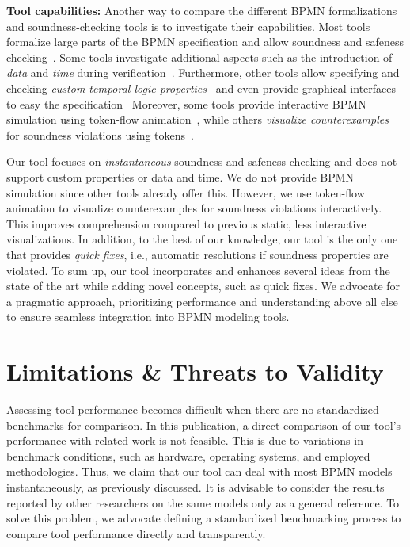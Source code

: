 \documentclass[runningheads]{llncs}
\begin{document}
\textbf{Tool capabilities:}
Another way to compare the different BPMN formalizations and soundness-checking tools is to investigate their capabilities.
Most tools formalize large parts of the BPMN specification and allow soundness and safeness checking~\cite{corradiniFormalApproachAnalysis2021,houhouFirstOrderLogicVerification2022,krauterFormalizationAnalysisBPMN2023,krauterHigherorderTransformationApproach2023}.
Some tools investigate additional aspects such as the introduction of \textit{data} and \textit{time} during verification~\cite{corradiniFormalisingAnimatingMultiple2022,houhouFirstOrderLogicVerification2022}.
Furthermore, other tools allow specifying and checking \textit{custom temporal logic properties}~\cite{corradiniFormalApproachAnalysis2021,krauterFormalizationAnalysisBPMN2023} and even provide graphical interfaces to easy the specification~\cite{krauterHigherorderTransformationApproach2023}
Moreover, some tools provide interactive BPMN simulation using token-flow animation~\cite{camundaservicesgmbhBpmnjsTokenSimulation2024,corradiniFormalisingAnimatingMultiple2022}, while others \textit{visualize counterexamples} for soundness violations using tokens~\cite{houhouFirstOrderLogicVerification2022}.

Our tool focuses on \textit{instantaneous} soundness and safeness checking and does not support custom properties or data and time.
We do not provide BPMN simulation since other tools already offer this.
However, we use token-flow animation to visualize counterexamples for soundness violations interactively.
This improves comprehension compared to previous static, less interactive visualizations.
In addition, to the best of our knowledge, our tool is the only one that provides \textit{quick fixes}, i.e., automatic resolutions if soundness properties are violated.
To sum up, our tool incorporates and enhances several ideas from the state of the art while adding novel concepts, such as quick fixes.
We advocate for a pragmatic approach, prioritizing performance and understanding above all else to ensure seamless integration into BPMN modeling tools.

\section{Limitations \& Threats to Validity} \label{sec:limitations}
Assessing tool performance becomes difficult when there are no standardized benchmarks for comparison.
In this publication, a direct comparison of our tool's performance with related work is not feasible.
This is due to variations in benchmark conditions, such as hardware, operating systems, and employed methodologies.
Thus, we claim that our tool can deal with most BPMN models instantaneously, as previously discussed.
It is advisable to consider the results reported by other researchers on the same models only as a general reference.
To solve this problem, we advocate defining a standardized benchmarking process to compare tool performance directly and transparently.
\end{document}
